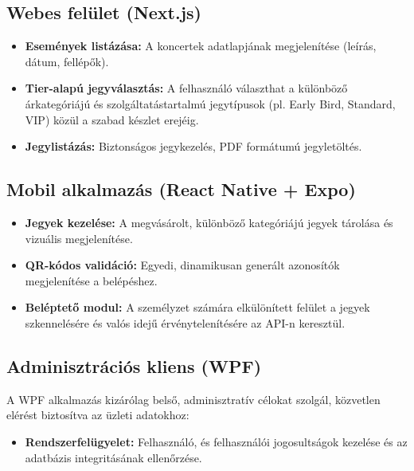 \documentclass[colorlinks]{docs}
\theoremstyle{definition}
\theoremstyle{remark}
\begin{document}
\subsection{Webes felület (Next.js)}
\begin{itemize}
    \item \textbf{Események listázása:} A koncertek adatlapjának megjelenítése (leírás, dátum, fellépők).
    \item \textbf{Tier-alapú jegyválasztás:} A felhasználó választhat a különböző árkategóriájú és szolgáltatástartalmú jegytípusok (pl. Early Bird, Standard, VIP) közül a szabad készlet erejéig.
    \item \textbf{Jegylistázás:} Biztonságos jegykezelés, PDF formátumú jegyletöltés.
\end{itemize}

\subsection{Mobil alkalmazás (React Native + Expo)}
\begin{itemize}
    \item \textbf{Jegyek kezelése:} A megvásárolt, különböző kategóriájú jegyek tárolása és vizuális megjelenítése.
    \item \textbf{QR-kódos validáció:} Egyedi, dinamikusan generált azonosítók megjelenítése a belépéshez.
    \item \textbf{Beléptető modul:} A személyzet számára elkülönített felület a jegyek szkennelésére és valós idejű érvénytelenítésére az API-n keresztül.
\end{itemize}

\subsection{Adminisztrációs kliens (WPF)}
A WPF alkalmazás kizárólag belső, adminisztratív célokat szolgál, közvetlen elérést biztosítva az üzleti adatokhoz:
\begin{itemize}
    \item \textbf{Rendszerfelügyelet:} Felhasználó, és felhasználói jogosultságok kezelése és az adatbázis integritásának ellenőrzése.
\end{itemize}
\end{document}
